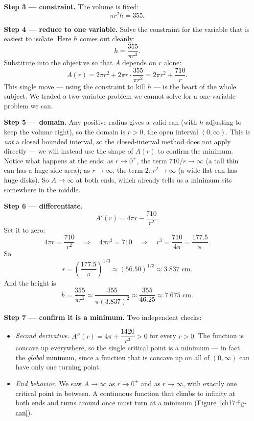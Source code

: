 \textbf{Step 3 --- constraint.} The volume is fixed:
\[
\pi r^2 h = 355.
\]

\textbf{Step 4 --- reduce to one variable.} Solve the constraint for the variable
that is easiest to isolate. Here $h$ comes out cleanly:
\[
h = \frac{355}{\pi r^2}.
\]
Substitute into the objective so that $A$ depends on $r$ alone:
\[
A(r) = 2\pi r^2 + 2\pi r\cdot \frac{355}{\pi r^2}
     = 2\pi r^2 + \frac{710}{r}.
\]
This single move --- using the constraint to kill $h$ --- is the heart of the whole
subject. We traded a two-variable problem we cannot solve for a one-variable problem
we can.

\textbf{Step 5 --- domain.} Any positive radius gives a valid can (with $h$ adjusting
to keep the volume right), so the domain is $r>0$, the open interval $(0,\infty)$.
This is \emph{not} a closed bounded interval, so the closed-interval method does not
apply directly --- we will instead use the shape of $A(r)$ to confirm the minimum.
Notice what happens at the ends: as $r\to 0^+$, the term $710/r\to\infty$ (a tall
thin can has a huge side area); as $r\to\infty$, the term $2\pi r^2\to\infty$ (a wide
flat can has huge disks). So $A\to\infty$ at both ends, which already tells us a
minimum sits somewhere in the middle.

\textbf{Step 6 --- differentiate.}
\[
A'(r) = 4\pi r - \frac{710}{r^2}.
\]
Set it to zero:
\[
4\pi r = \frac{710}{r^2}
\quad\Longrightarrow\quad
4\pi r^3 = 710
\quad\Longrightarrow\quad
r^3 = \frac{710}{4\pi} = \frac{177.5}{\pi}.
\]
So
\[
r = \left(\frac{177.5}{\pi}\right)^{1/3} \approx (56.50)^{1/3} \approx 3.837\text{ cm}.
\]
And the height is
\[
h = \frac{355}{\pi r^2} \approx \frac{355}{\pi (3.837)^2}
  \approx \frac{355}{46.25} \approx 7.675\text{ cm}.
\]

\textbf{Step 7 --- confirm it is a minimum.} Two independent checks:
\begin{itemize}
  \item \emph{Second derivative.} $A''(r) = 4\pi + \dfrac{1420}{r^3} > 0$ for every
    $r>0$. The function is concave up everywhere, so the single critical point is a
    minimum --- in fact the \emph{global} minimum, since a function that is concave up
    on all of $(0,\infty)$ can have only one turning point.
  \item \emph{End behavior.} We saw $A\to\infty$ as $r\to0^+$ and as $r\to\infty$,
    with exactly one critical point in between. A continuous function that climbs to
    infinity at both ends and turns around once must turn at a minimum
(Figure~\ref{ch17:fig-can}).
\end{itemize}

